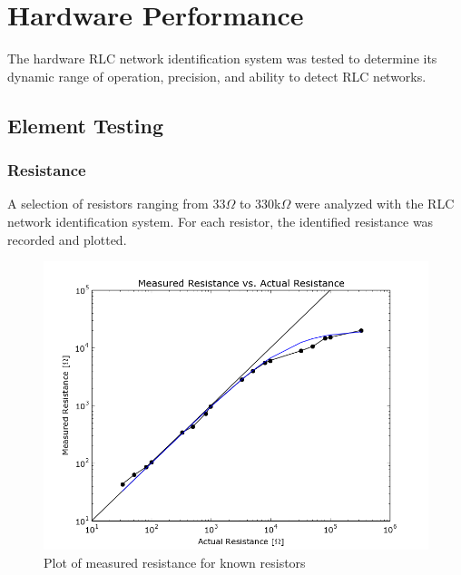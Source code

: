 \documentclass[11pt,twoside]{mitthesis}
\newcommand{\ohm}{$\Omega$ }
\begin{document}
\section{Hardware Performance}

The hardware RLC network identification system was tested to determine its dynamic range of operation, precision, and ability to detect RLC networks.

\subsection{Element Testing}
\subsubsection{Resistance}
A selection of resistors ranging from 33\ohm to 330k\ohm were analyzed with the RLC network identification system.  
For each resistor, the identified resistance was recorded and plotted. 

\begin{figure}[H]
	\label{fig:rplot}
  \begin{center}
      \includegraphics[width=.7\textwidth]{../rin-ro.png}
      \caption{Plot of measured resistance for known resistors}
  \end{center}
\end{figure}
\end{document}
